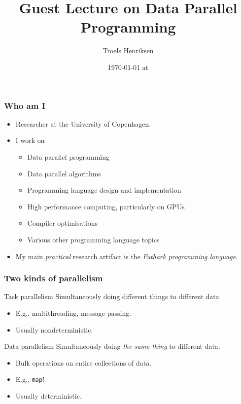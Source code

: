 

\title{Guest Lecture on Data Parallel Programming}
\date{\today{} at \currenttime{}}
\author{Troels Henriksen}

\usepackage{futhark}

\lstset{language=futhark,showlines=true}



\maketitle

\begin{frame}
  \frametitle{Who am I}

  \begin{itemize}
  \item Researcher at the University of Copenhagen.
  \item I work on
    \begin{itemize}
    \item Data parallel programming
    \item Data parallel algorithms
    \item Programming language design and implementation
    \item High performance computing, particularly on GPUs
    \item Compiler optimisations
    \item Various other programming language topics
    \end{itemize}
  \item My main \emph{practical} research artifact is the \emph{Futhark
      programming language}.
  \end{itemize}

\end{frame}

\begin{frame}
  \frametitle{Two kinds of parallelism}

  \begin{block}{Task parallelism}
    Simultaneously doing different things to different data
    \begin{itemize}
    \item E.g., multithreading, message passing.
    \item Usually nondeterministic.
    \end{itemize}
  \end{block}

  \begin{block}{Data parallelism}
    Simultaneously doing \emph{the same thing} to different data.
    \begin{itemize}
    \item Bulk operations on entire collections of data.
    \item E.g., \texttt{map}!
    \item Usually deterministic.
    \end{itemize}
  \end{block}
\end{frame}


